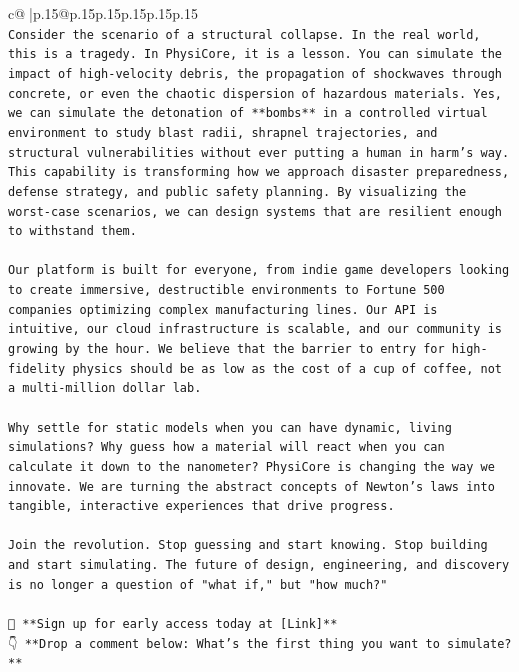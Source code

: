\documentclass{article}
\begin{document}
{\begin{supertabular}{c@{$\;$}|p{.15\linewidth}@{}p{.15\linewidth}p{.15\linewidth}p{.15\linewidth}p{.15\linewidth}p{.15\linewidth}}
{{{\\ 
\texttt{Consider the scenario of a structural collapse. In the real world, this is a tragedy. In PhysiCore, it is a lesson. You can simulate the impact of high{-}velocity debris, the propagation of shockwaves through concrete, or even the chaotic dispersion of hazardous materials. Yes, we can simulate the detonation of **bombs** in a controlled virtual environment to study blast radii, shrapnel trajectories, and structural vulnerabilities without ever putting a human in harm's way. This capability is transforming how we approach disaster preparedness, defense strategy, and public safety planning. By visualizing the worst{-}case scenarios, we can design systems that are resilient enough to withstand them.} \\
\\ 
\texttt{Our platform is built for everyone, from indie game developers looking to create immersive, destructible environments to Fortune 500 companies optimizing complex manufacturing lines. Our API is intuitive, our cloud infrastructure is scalable, and our community is growing by the hour. We believe that the barrier to entry for high{-}fidelity physics should be as low as the cost of a cup of coffee, not a multi{-}million dollar lab.} \\
\\ 
\texttt{Why settle for static models when you can have dynamic, living simulations? Why guess how a material will react when you can calculate it down to the nanometer? PhysiCore is changing the way we innovate. We are turning the abstract concepts of Newton's laws into tangible, interactive experiences that drive progress.} \\
\\ 
\texttt{Join the revolution. Stop guessing and start knowing. Stop building and start simulating. The future of design, engineering, and discovery is no longer a question of "what if," but "how much?"} \\
\\ 
\texttt{🔗 **Sign up for early access today at {[}Link{]}**} \\
\texttt{👇 **Drop a comment below: What's the first thing you want to simulate?**} \\
\\ 
}}}
\end{supertabular}}
\end{document}

